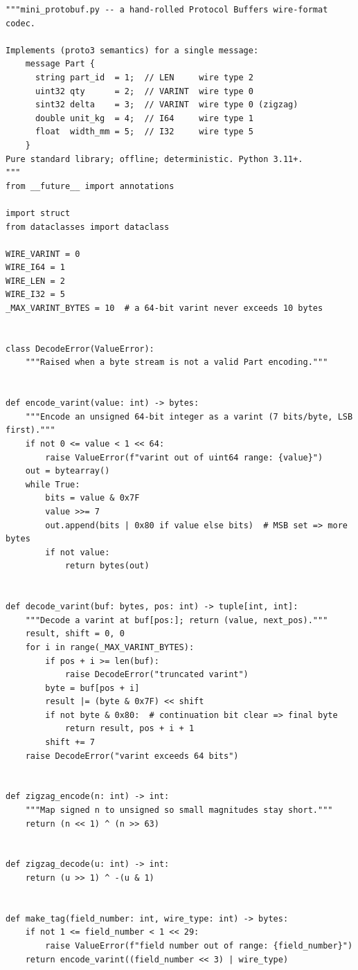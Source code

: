 \begin{verbatim}
"""mini_protobuf.py -- a hand-rolled Protocol Buffers wire-format codec.

Implements (proto3 semantics) for a single message:
    message Part {
      string part_id  = 1;  // LEN     wire type 2
      uint32 qty      = 2;  // VARINT  wire type 0
      sint32 delta    = 3;  // VARINT  wire type 0 (zigzag)
      double unit_kg  = 4;  // I64     wire type 1
      float  width_mm = 5;  // I32     wire type 5
    }
Pure standard library; offline; deterministic. Python 3.11+.
"""
from __future__ import annotations

import struct
from dataclasses import dataclass

WIRE_VARINT = 0
WIRE_I64 = 1
WIRE_LEN = 2
WIRE_I32 = 5
_MAX_VARINT_BYTES = 10  # a 64-bit varint never exceeds 10 bytes


class DecodeError(ValueError):
    """Raised when a byte stream is not a valid Part encoding."""


def encode_varint(value: int) -> bytes:
    """Encode an unsigned 64-bit integer as a varint (7 bits/byte, LSB first)."""
    if not 0 <= value < 1 << 64:
        raise ValueError(f"varint out of uint64 range: {value}")
    out = bytearray()
    while True:
        bits = value & 0x7F
        value >>= 7
        out.append(bits | 0x80 if value else bits)  # MSB set => more bytes
        if not value:
            return bytes(out)


def decode_varint(buf: bytes, pos: int) -> tuple[int, int]:
    """Decode a varint at buf[pos:]; return (value, next_pos)."""
    result, shift = 0, 0
    for i in range(_MAX_VARINT_BYTES):
        if pos + i >= len(buf):
            raise DecodeError("truncated varint")
        byte = buf[pos + i]
        result |= (byte & 0x7F) << shift
        if not byte & 0x80:  # continuation bit clear => final byte
            return result, pos + i + 1
        shift += 7
    raise DecodeError("varint exceeds 64 bits")


def zigzag_encode(n: int) -> int:
    """Map signed n to unsigned so small magnitudes stay short."""
    return (n << 1) ^ (n >> 63)


def zigzag_decode(u: int) -> int:
    return (u >> 1) ^ -(u & 1)


def make_tag(field_number: int, wire_type: int) -> bytes:
    if not 1 <= field_number < 1 << 29:
        raise ValueError(f"field number out of range: {field_number}")
    return encode_varint((field_number << 3) | wire_type)



\end{verbatim}

